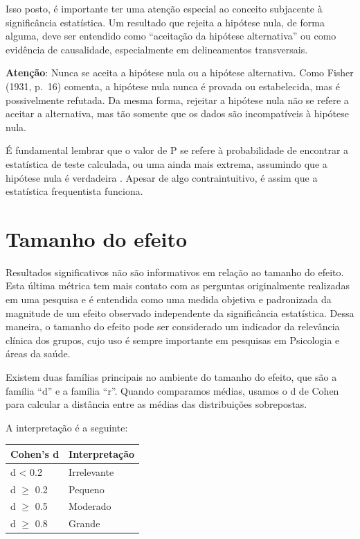 \documentclass[
]{book}
\begin{document}
Isso posto, é importante ter uma atenção especial ao conceito subjacente à significância estatística. Um resultado que rejeita a hipótese nula, de forma alguma, deve ser entendido como ``aceitação da hipótese alternativa'' ou como evidência de causalidade, especialmente em delineamentos transversais.

\textbf{Atenção}: Nunca se aceita a hipótese nula ou a hipótese alternativa. Como Fisher (1931, p.~16) comenta, a hipótese nula nunca é provada ou estabelecida, mas é possivelmente refutada. Da mesma forma, rejeitar a hipótese nula não se refere a aceitar a alternativa, mas tão somente que os dados são incompatíveis à hipótese nula.

É fundamental lembrar que o valor de P se refere à probabilidade de encontrar a estatística de teste calculada, ou uma ainda mais extrema, assumindo que a hipótese nula é verdadeira \citep{Wasserstein2016}. Apesar de algo contraintuitivo, é assim que a estatística frequentista funciona.

\hypertarget{tamanho-do-efeito-1}{%
\section{Tamanho do efeito}\label{tamanho-do-efeito-1}}

Resultados significativos não são informativos em relação ao tamanho do efeito. Esta última métrica tem mais contato com as perguntas originalmente realizadas em uma pesquisa e é entendida como uma medida objetiva e padronizada da magnitude de um efeito observado independente da significância estatística. Dessa maneira, o tamanho do efeito pode ser considerado um indicador da relevância clínica dos grupos, cujo uso é sempre importante em pesquisas em Psicologia e áreas da saúde.

Existem duas famílias principais no ambiente do tamanho do efeito, que são a família ``d'' e a família ``r''. Quando comparamos médias, usamos o d de Cohen para calcular a distância entre as médias das distribuições sobrepostas.

A interpretação é a seguinte:

\begin{longtable}[]{@{}ll@{}}
\toprule
Cohen's d & Interpretação \\
\midrule
\endhead
d \textless{} 0.2 & Irrelevante \\
d \(\geq\) 0.2 & Pequeno \\
d \(\geq\) 0.5 & Moderado \\
d \(\geq\) 0.8 & Grande \\
\bottomrule
\end{longtable}
\end{document}
